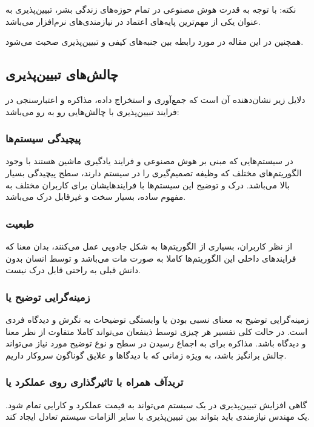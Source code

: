 نکته: با توجه به قدرت هوش مصنوعی در تمام حوزه‌های زندگی بشر، تبیین‌پذیری به
عنوان یکی از مهم‌ترین پایه‌های اعتماد در نیازمندی‌های نرم‌افزار می‌باشد.


همچنین در این مقاله در مورد رابطه بین جنبه‌های کیفی و تبیین‌پذیری صحبت می‌شود.

\subsection{چالش‌های تبیین‌پذیری}

دلایل زیر نشان‌دهنده آن است که جمع‌آوری و استخراج داده، مذاکره و اعتبارسنجی در
فرایند تبیین‌پذیری با چالش‌هایی رو به رو می‌باشد:

\subsubsection{پیچیدگی سیستم‌ها}

در سیستم‌هایی که مبنی بر هوش مصنوعی و فرایند یادگیری ماشین هستند با وجود
الگوریتم‌های مختلف که وظیفه تصمیم‌گیری را در سیستم دارند، سطح پیچیدگی بسیار بالا
می‌باشد. درک و توضیح این سیستم‌ها با فرایند‌هایشان برای کاربران مختلف به مفهوم
ساده، بسیار سخت و غیرقابل درک می‌باشد.

\subsubsection{طبعیت }

از نظر کاربران، بسیاری از الگوریتم‌ها به شکل جادویی عمل می‌کنند، بدان معنا که
فرایند‌های داخلی این الگوریتم‌ها کاملا به صورت مات می‌باشد و توسط انسان بدون
دانش قبلی به راحتی قابل درک نیست.

\subsubsection{زمینه‌گرایی توضیح یا }

زمینه‌گرایی توضیح به معنای نسبی بودن یا وابستگی توضیحات به نگرش و دیدگاه فردی
است. در حالت کلی تفسیر هر چیزی توسط ذینفعان می‌تواند کاملا متفاوت از نظر معنا و
دیدگاه باشد. مذاکره برای به اجماع رسیدن در سطح و نوع توضیح مورد نیاز می‌تواند
چالش برانگیز باشد، به ویژه زمانی که با دیدگاها و علایق گوناگون سروکار داریم.

\subsubsection{تریدآف همراه با تاثیرگذاری روی عملکرد یا }

گاهی افزایش تبیین‌پذیری در یک سیستم می‌تواند به قیمت عملکرد و کارایی تمام شود.
یک مهندس نیازمندی باید بتواند بین تبیین‌پذیری با سایر الزامات سیستم  تعادل  ایجاد کند.